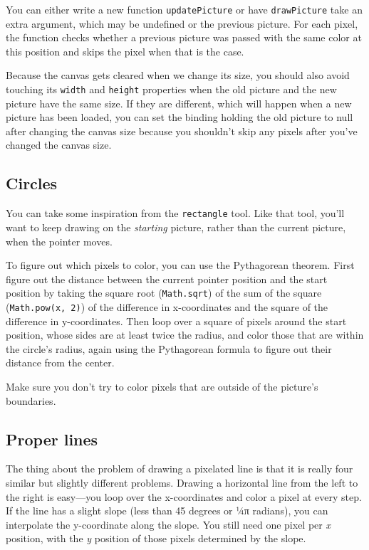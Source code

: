 You can either write a new function \lstinline`updatePicture` or have \lstinline`drawPicture` take an extra argument, which may be undefined or the previous picture. For each pixel, the function checks whether a previous picture was passed with the same color at this position and skips the pixel when that is the case.

Because the canvas gets cleared when we change its size, you should also avoid touching its \lstinline`width` and \lstinline`height` properties when the old picture and the new picture have the same size. If they are different, which will happen when a new picture has been loaded, you can set the binding holding the old picture to null after changing the canvas size because you shouldn't skip any pixels after you've changed the canvas size.

\subsection{Circles}

You can take some inspiration from the \lstinline`rectangle` tool. Like that tool, you'll want to keep drawing on the \emph{starting} picture, rather than the current picture, when the pointer moves.

To figure out which pixels to color, you can use the Pythagorean
theorem. First figure out the distance between the current pointer position and the start position by taking the square root (\lstinline`Math.sqrt`) of the sum of the square (\lstinline`Math.pow(x, 2)`) of the difference in x-coordinates and the square of the difference in y-coordinates. Then loop over a square of pixels around the start position, whose sides are at least twice the radius, and color those that are within the circle's radius, again using the Pythagorean formula to figure out their distance from the center.

Make sure you don't try to color pixels that are outside of the picture's boundaries.

\subsection{Proper lines}

The thing about the problem of drawing a pixelated line is that it is really four similar but slightly different problems. Drawing a horizontal line from the left to the right is easy—you loop over the x-coordinates and color a pixel at every step. If the line has a slight slope (less than 45 degrees or ¼π radians), you can interpolate the y-coordinate along the slope. You still need one pixel per \emph{x} position, with the \emph{y} position of those pixels determined by the slope.

